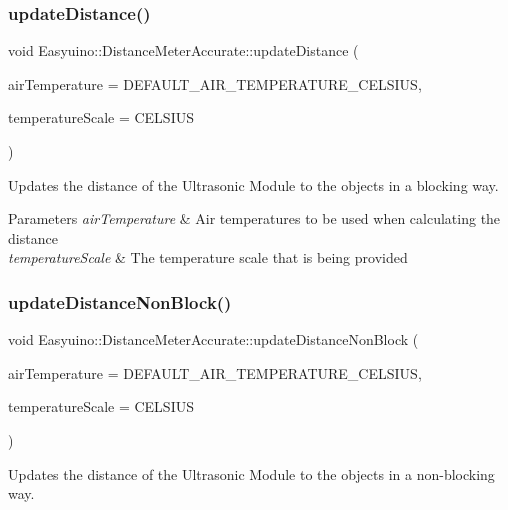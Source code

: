 \subsubsection{\texorpdfstring{update\+Distance()}{updateDistance()}}
{\footnotesize\ttfamily void Easyuino\+::\+Distance\+Meter\+Accurate\+::update\+Distance (\begin{DoxyParamCaption}\item[{IN float}]{air\+Temperature = {\ttfamily DEFAULT\+\_\+AIR\+\_\+TEMPERATURE\+\_\+CELSIUS},  }\item[{IN Temperature\+Scale}]{temperature\+Scale = {\ttfamily CELSIUS} }\end{DoxyParamCaption})}



Updates the distance of the Ultrasonic Module to the objects in a blocking way. 


\begin{DoxyParams}{Parameters}
{\em air\+Temperature} & Air temperatures to be used when calculating the distance \\
\hline
{\em temperature\+Scale} & The temperature scale that is being provided \\
\hline
\end{DoxyParams}
\mbox{\label{class_easyuino_1_1_distance_meter_accurate_ac428b0dfd816862fab277b2da1f0c164}} 
\subsubsection{\texorpdfstring{update\+Distance\+Non\+Block()}{updateDistanceNonBlock()}}
{\footnotesize\ttfamily void Easyuino\+::\+Distance\+Meter\+Accurate\+::update\+Distance\+Non\+Block (\begin{DoxyParamCaption}\item[{IN float}]{air\+Temperature = {\ttfamily DEFAULT\+\_\+AIR\+\_\+TEMPERATURE\+\_\+CELSIUS},  }\item[{IN Temperature\+Scale}]{temperature\+Scale = {\ttfamily CELSIUS} }\end{DoxyParamCaption})}



Updates the distance of the Ultrasonic Module to the objects in a non-\/blocking way. 

